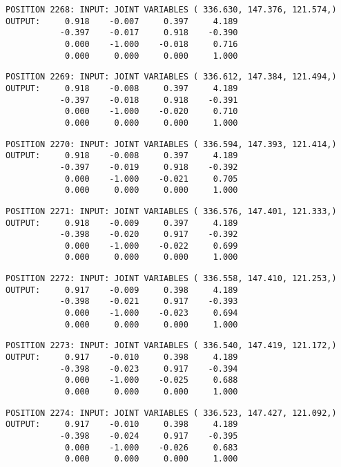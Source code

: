 \begin{verbatim}
POSITION 2268: INPUT: JOINT VARIABLES ( 336.630, 147.376, 121.574,)
OUTPUT:     0.918    -0.007     0.397     4.189
           -0.397    -0.017     0.918    -0.390
            0.000    -1.000    -0.018     0.716
            0.000     0.000     0.000     1.000
\end{verbatim} \pagebreak[1]\begin{verbatim}
POSITION 2269: INPUT: JOINT VARIABLES ( 336.612, 147.384, 121.494,)
OUTPUT:     0.918    -0.008     0.397     4.189
           -0.397    -0.018     0.918    -0.391
            0.000    -1.000    -0.020     0.710
            0.000     0.000     0.000     1.000
\end{verbatim} \pagebreak[1]\begin{verbatim}
POSITION 2270: INPUT: JOINT VARIABLES ( 336.594, 147.393, 121.414,)
OUTPUT:     0.918    -0.008     0.397     4.189
           -0.397    -0.019     0.918    -0.392
            0.000    -1.000    -0.021     0.705
            0.000     0.000     0.000     1.000
\end{verbatim} \pagebreak[1]\begin{verbatim}
POSITION 2271: INPUT: JOINT VARIABLES ( 336.576, 147.401, 121.333,)
OUTPUT:     0.918    -0.009     0.397     4.189
           -0.398    -0.020     0.917    -0.392
            0.000    -1.000    -0.022     0.699
            0.000     0.000     0.000     1.000
\end{verbatim} \pagebreak[1]\begin{verbatim}
POSITION 2272: INPUT: JOINT VARIABLES ( 336.558, 147.410, 121.253,)
OUTPUT:     0.917    -0.009     0.398     4.189
           -0.398    -0.021     0.917    -0.393
            0.000    -1.000    -0.023     0.694
            0.000     0.000     0.000     1.000
\end{verbatim} \pagebreak[1]\begin{verbatim}
POSITION 2273: INPUT: JOINT VARIABLES ( 336.540, 147.419, 121.172,)
OUTPUT:     0.917    -0.010     0.398     4.189
           -0.398    -0.023     0.917    -0.394
            0.000    -1.000    -0.025     0.688
            0.000     0.000     0.000     1.000
\end{verbatim} \pagebreak[1]\begin{verbatim}
POSITION 2274: INPUT: JOINT VARIABLES ( 336.523, 147.427, 121.092,)
OUTPUT:     0.917    -0.010     0.398     4.189
           -0.398    -0.024     0.917    -0.395
            0.000    -1.000    -0.026     0.683
            0.000     0.000     0.000     1.000
\end{verbatim} \pagebreak[1]\begin{verbatim}

\end{verbatim}
